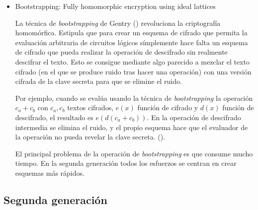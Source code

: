 \begin{itemize}

    \item Bootstrapping: Fully homomorphic encryption using ideal lattices

    La técnica de \textit{bootstrapping} de Gentry (\cite{gentry_fully_2009}) revoluciona la criptografía homomórfica. Estipula que para crear un esquema de cifrado que permita la evaluación arbitraria de circuitos lógicos símplemente hace falta un esquema de cifrado que pueda realizar la operación de descifrado sin realmente descifrar el texto. Esto se consigue mediante algo parecido a mezclar el texto cifrado (en el que se produce ruido tras hacer una operación) con una versión cifrada de la clave secreta para que se elimine el ruido.

    Por ejemplo, cuando se evalúa usando la técnica de \textit{bootstrapping} la operación $ c_a + c_b$ con $c_a, c_b$ textos cifrados, $e(x)$ función de cifrado y  $d(x)$ función de descifrado, el resultado es $e(d(c_a + c_b) )$. En la operación de descifrado intermedia se elimina el ruido, y el propio esquema hace que el evaluador de la operación no pueda revelar la clave secreta. (\cite{noauthor_homomorphic_nodate-3}).

    El principal problema de la operación de \textit{bootstrapping} es que consume mucho tiempo. En la segunda generación todos los esfuerzos se centran en crear esquemas más rápidos.

\end{itemize}

\subsection{Segunda generación}

